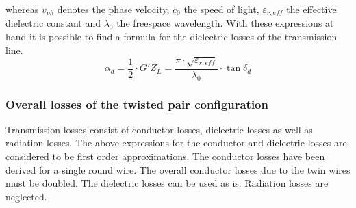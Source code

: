 whereas $v_{ph}$ denotes the phase velocity, $c_0$ the speed of light,
$\varepsilon_{r,eff}$ the effective dielectric constant and
$\lambda_0$ the freespace wavelength.  With these expressions at hand
it is possible to find a formula for the dielectric losses of the
transmission line.
\begin{equation}
\alpha_d = \dfrac{1}{2}\cdot G'Z_L = \dfrac{\pi\cdot \sqrt{\varepsilon_{r,eff}}}{\lambda_0}\cdot \tan{ \delta_d }
\end{equation}

\subsubsection{Overall losses of the twisted pair configuration}

Transmission losses consist of conductor losses, dielectric losses as
well as radiation losses.  The above expressions for the conductor and
dielectric losses are considered to be first order approximations.
The conductor losses have been derived for a single round wire.  The
overall conductor losses due to the twin wires must be doubled.  The
dielectric losses can be used as is.  Radiation losses are neglected.
